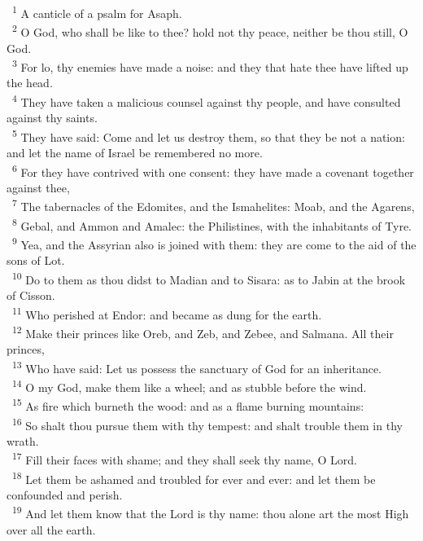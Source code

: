 \documentclass[a5paper,12pt]{article}
\begin{document}
\begin{multicols*}{2}
~\textsuperscript{1} A canticle of a psalm for Asaph.\\
~\textsuperscript{2} O God, who shall be like to thee? hold not thy peace, neither be thou still, O God.\\
~\textsuperscript{3} For lo, thy enemies have made a noise: and they that hate thee have lifted up the head.\\
~\textsuperscript{4} They have taken a malicious counsel against thy people, and have consulted against thy saints.\\
~\textsuperscript{5} They have said: Come and let us destroy them, so that they be not a nation: and let the name of Israel be remembered no more.\\
~\textsuperscript{6} For they have contrived with one consent: they have made a covenant together against thee,\\
~\textsuperscript{7} The tabernacles of the Edomites, and the Ismahelites: Moab, and the Agarens,\\
~\textsuperscript{8} Gebal, and Ammon and Amalec: the Philistines, with the inhabitants of Tyre.\\
~\textsuperscript{9} Yea, and the Assyrian also is joined with them: they are come to the aid of the sons of Lot.\\
~\textsuperscript{10} Do to them as thou didst to Madian and to Sisara: as to Jabin at the brook of Cisson.\\
~\textsuperscript{11} Who perished at Endor: and became as dung for the earth.\\
~\textsuperscript{12} Make their princes like Oreb, and Zeb, and Zebee, and Salmana. All their princes,\\
~\textsuperscript{13} Who have said: Let us possess the sanctuary of God for an inheritance.\\
~\textsuperscript{14} O my God, make them like a wheel; and as stubble before the wind.\\
~\textsuperscript{15} As fire which burneth the wood: and as a flame burning mountains:\\
~\textsuperscript{16} So shalt thou pursue them with thy tempest: and shalt trouble them in thy wrath.\\
~\textsuperscript{17} Fill their faces with shame; and they shall seek thy name, O Lord.\\
~\textsuperscript{18} Let them be ashamed and troubled for ever and ever: and let them be confounded and perish.\\
~\textsuperscript{19} And let them know that the Lord is thy name: thou alone art the most High over all the earth.\\


\end{multicols*}
\end{document}
